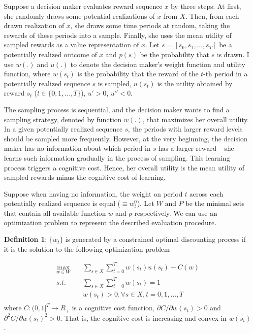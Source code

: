 \documentclass[
  12pt,
]{article}
\begin{document}
Suppose a decision maker evaluates reward sequence \(x\) by three steps:
At first, she randomly draws some potential realizations of \(x\) from
\(X\). Then, from each drawn realization of \(x\), she draws some time
periods at random, taking the rewards of these periods into a sample.
Finally, she uses the mean utility of sampled rewards as a value
representation of \(x\). Let \(s=[s_0,s_1,...,s_T]\) be a potentially
realized outcome of \(x\) and \(p(s)\) be the probability that \(s\) is
drawn. I use \(w(.)\) and \(u(.)\) to denote the decision maker's weight
function and utility function, where \(w(s_t)\) is the probability that
the reward of the \(t\)-th period in a potentially realized sequence
\(s\) is sampled, \(u(s_t)\) is the utility obtained by reward \(s_t\)
(\(t \in \{0,1,...,T\}\)), \(u'>0\), \(u''<0\).

The sampling process is sequential, and the decision maker wants to find
a sampling strategy, denoted by function \(w(.)\), that maximizes her
overall utility. In a given potentially realized sequence \(s\), the
periods with larger reward levels should be sampled more frequently.
However, at the very beginning, the decision maker has no information
about which period in \(s\) has a larger reward -- she learns such
information gradually in the process of sampling. This learning process
triggers a cognitive cost. Hence, her overall utility is the mean
utility of sampled rewards minus the cognitive cost of learning.

Suppose when having no information, the weight on period \(t\) across
each potentially realized sequence is equal (\(\equiv w^0_t\)). Let
\(W\) and \(P\) be the minimal sets that contain all available function
\(w\) and \(p\) respectively. We can use an optimization problem to
represent the described evaluation procedure.

\textbf{Definition 1}: \(\{w_t\}\) is generated by a constrained optimal
discounting process if it is the solution to the following optimization
problem

\[ 
\begin{aligned}
\max_{w\in W}  \quad & \sum_{s\in X}\sum_{t=0}^T w(s_t)u(s_t) - C(w) \\
s.t. \quad &  \sum_{s\in X}\sum_{t=0}^T w(s_t)=1 \\
& w(s_t)>0, \forall s\in X,t=0,1,…,T \\
\end{aligned}
\]where \(C:(0,1]^T\rightarrow R_{+}\) is a cognitive cost function,
\(\partial C/\partial w(s_t)>0\) and
\(\partial^2 C/\partial w(s_t)^2>0\). That is, the cognitive cost is
increasing and convex in \(w(s_t)\).
\end{document}
